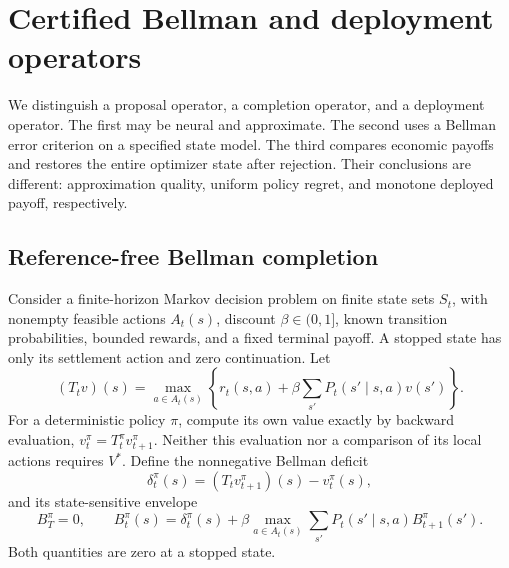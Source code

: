 \section{Certified Bellman and deployment operators}\label{sec:operators28}
We distinguish a proposal operator, a completion operator, and a deployment operator. The first may be neural and approximate. The second uses a Bellman error criterion on a specified state model. The third compares economic payoffs and restores the entire optimizer state after rejection. Their conclusions are different: approximation quality, uniform policy regret, and monotone deployed payoff, respectively.

\subsection{Reference-free Bellman completion}
Consider a finite-horizon Markov decision problem on finite state sets $S_t$, with nonempty feasible actions $A_t(s)$, discount $\beta\in(0,1]$, known transition probabilities, bounded rewards, and a fixed terminal payoff. A stopped state has only its settlement action and zero continuation. Let
\begin{equation}
 (T_tv)(s)=\max_{a\in A_t(s)}\left\{r_t(s,a)+\beta\sum_{s'}P_t(s'\mid s,a)v(s')\right\}.
\end{equation}
For a deterministic policy $\pi$, compute its own value exactly by backward evaluation, $v_t^\pi=T_t^\pi v_{t+1}^\pi$. Neither this evaluation nor a comparison of its local actions requires $V^*$. Define the nonnegative Bellman deficit
\begin{equation}\label{eq:localdeficit28}
 \delta_t^\pi(s)=(T_tv_{t+1}^\pi)(s)-v_t^\pi(s),
\end{equation}
and its state-sensitive envelope
\begin{equation}\label{eq:envelope28}
 B_T^\pi=0,\qquad
 B_t^\pi(s)=\delta_t^\pi(s)+\beta\max_{a\in A_t(s)}\sum_{s'}P_t(s'\mid s,a)B_{t+1}^\pi(s').
\end{equation}
Both quantities are zero at a stopped state.
